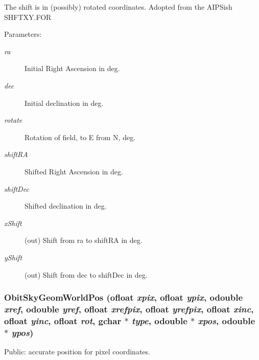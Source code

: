 The shift is in (possibly) rotated coordinates. Adopted from the AIPSish SHFTXY.FOR \begin{Desc}
\item[Parameters:]
\begin{description}
\item[{\em ra}]Initial Right Ascension in deg. \item[{\em dec}]Initial declination in deg. \item[{\em rotate}]Rotation of field, to E from N, deg. \item[{\em shift\-RA}]Shifted Right Ascension in deg. \item[{\em shift\-Dec}]Shifted declination in deg. \item[{\em x\-Shift}](out) Shift from ra to shift\-RA in deg. \item[{\em y\-Shift}](out) Shift from dec to shift\-Dec in deg. \end{description}
\end{Desc}
\subsubsection{ Obit\-Sky\-Geom\-World\-Pos ({\bf ofloat} {\em xpix}, {\bf ofloat} {\em ypix}, {\bf odouble} {\em xref}, {\bf odouble} {\em yref}, {\bf ofloat} {\em xrefpix}, {\bf ofloat} {\em yrefpix}, {\bf ofloat} {\em xinc}, {\bf ofloat} {\em yinc}, {\bf ofloat} {\em rot}, gchar $\ast$ {\em type}, {\bf odouble} $\ast$ {\em xpos}, {\bf odouble} $\ast$ {\em ypos})}\label{ObitSkyGeom_8h_a13}


Public: accurate position for pixel coordinates. 

